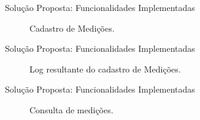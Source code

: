 \begin{frame}{Solução Proposta: Funcionalidades Implementadas}
\begin{figure}[h!]
\centering
{}
\caption{Cadastro de Medições.}
\end{figure}
\end{frame}

\begin{frame}{Solução Proposta: Funcionalidades Implementadas}
\begin{figure}[h!]
\centering
{}
\caption{Log resultante do cadastro de Medições.}
\end{figure}
\end{frame}

\begin{frame}{Solução Proposta: Funcionalidades Implementadas}
\begin{figure}[h!]
\centering
{}
\caption{Consulta de medições.}
\end{figure}
\end{frame}

